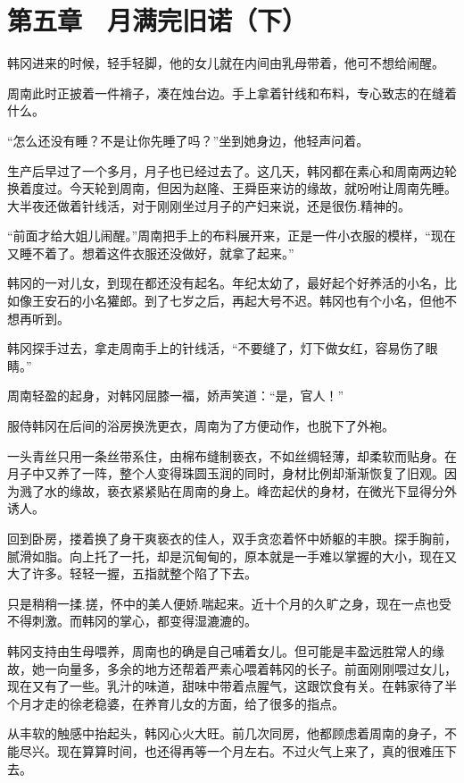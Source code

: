 \section{第五章　月满完旧诺（下）}

韩冈进来的时候，轻手轻脚，他的女儿就在内间由乳母带着，他可不想给闹醒。

周南此时正披着一件褙子，凑在烛台边。手上拿着针线和布料，专心致志的在缝着什么。

“怎么还没有睡？不是让你先睡了吗？”坐到她身边，他轻声问着。

生产后早过了一个多月，月子也已经过去了。这几天，韩冈都在素心和周南两边轮换着度过。今天轮到周南，但因为赵隆、王舜臣来访的缘故，就吩咐让周南先睡。大半夜还做着针线活，对于刚刚坐过月子的产妇来说，还是很伤.精神的。

“前面才给大姐儿闹醒。”周南把手上的布料展开来，正是一件小衣服的模样，“现在又睡不着了。想着这件衣服还没做好，就拿了起来。”

韩冈的一对儿女，到现在都还没有起名。年纪太幼了，最好起个好养活的小名，比如像王安石的小名獾郎。到了七岁之后，再起大号不迟。韩冈也有个小名，但他不想再听到。

韩冈探手过去，拿走周南手上的针线活，“不要缝了，灯下做女红，容易伤了眼睛。”

周南轻盈的起身，对韩冈屈膝一福，娇声笑道：“是，官人！”

服侍韩冈在后间的浴房换洗更衣，周南为了方便动作，也脱下了外袍。

一头青丝只用一条丝带系住，由棉布缝制亵衣，不如丝绸轻薄，却柔软而贴身。在月子中又养了一阵，整个人变得珠圆玉润的同时，身材比例却渐渐恢复了旧观。因为溅了水的缘故，亵衣紧紧贴在周南的身上。峰峦起伏的身材，在微光下显得分外诱人。

回到卧房，搂着换了身干爽亵衣的佳人，双手贪恋着怀中娇躯的丰腴。探手胸前，腻滑如脂。向上托了一托，却是沉甸甸的，原本就是一手难以掌握的大小，现在又大了许多。轻轻一握，五指就整个陷了下去。

只是稍稍一揉.搓，怀中的美人便娇.喘起来。近十个月的久旷之身，现在一点也受不得刺激。而韩冈的掌心，都变得湿漉漉的。

韩冈支持由生母喂养，周南也的确是自己哺着女儿。但可能是丰盈远胜常人的缘故，她一向量多，多余的地方还帮着严素心喂着韩冈的长子。前面刚刚喂过女儿，现在又有了一些。乳汁的味道，甜味中带着点腥气，这跟饮食有关。在韩家待了半个月才走的徐老稳婆，在养育儿女的方面，给了很多的指点。

从丰软的触感中抬起头，韩冈心火大旺。前几次同房，他都顾虑着周南的身子，不能尽兴。现在算算时间，也还得再等一个月左右。不过火气上来了，真的很难压下去。

